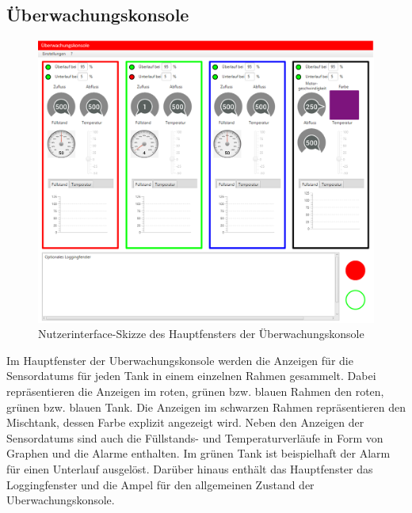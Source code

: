 \documentclass[parskip=full]{scrartcl}
\begin{document}
\subsection{Überwachungskonsole}
\begin{figure}[h!]
  \centering
  \includegraphics[scale=0.5]{media/ui-client/ui-uw.png}
  \caption{Nutzerinterface-Skizze des Hauptfensters der Überwachungskonsole}
\end{figure}
Im Hauptfenster der \gls{Uberwachungskonsole} werden die Anzeigen für die \glspl{Sensordatum} für jeden Tank in einem einzelnen Rahmen gesammelt. Dabei repräsentieren die Anzeigen im roten, grünen bzw. blauen Rahmen den roten, grünen bzw. blauen Tank. Die Anzeigen im schwarzen Rahmen repräsentieren den Mischtank, dessen Farbe explizit angezeigt wird.
Neben den Anzeigen der \glspl{Sensordatum} sind auch die Füllstands- und Temperaturverläufe in Form von Graphen und die Alarme enthalten. Im grünen Tank ist beispielhaft der Alarm für einen Unterlauf ausgelöst.
Darüber hinaus enthält das Hauptfenster das Loggingfenster und die Ampel für den allgemeinen Zustand der \gls{Uberwachungskonsole}.
\end{document}

